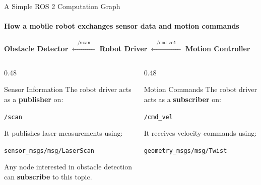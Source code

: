 \begin{frame}{A Simple ROS 2 Computation Graph}
\framesubtitle{How a mobile robot exchanges sensor data and motion commands}

\footnotesize

\begin{center}
    \textbf{Obstacle Detector}
    \(\xleftarrow{\quad \texttt{/scan} \quad}\)
    \textbf{Robot Driver}
    \(\xleftarrow{\quad \texttt{/cmd\_vel} \quad}\)
    \textbf{Motion Controller}
\end{center}

\vspace{0.15cm}

\begin{columns}[T,onlytextwidth]

    \begin{column}{0.48\textwidth}
        \begin{block}{Sensor Information}
            The robot driver acts as a
            \textbf{publisher} on:

            \begin{center}
                \texttt{/scan}
            \end{center}

            It publishes laser measurements using:

            \begin{center}
                \texttt{sensor\_msgs/msg/LaserScan}
            \end{center}

            Any node interested in obstacle detection can
            \textbf{subscribe} to this topic.
        \end{block}
    \end{column}

    \hfill

    \begin{column}{0.48\textwidth}
        \begin{exampleblock}{Motion Commands}
            The robot driver acts as a
            \textbf{subscriber} on:

            \begin{center}
                \texttt{/cmd\_vel}
            \end{center}

            It receives velocity commands using:

            \begin{center}
                \texttt{geometry\_msgs/msg/Twist}
            \end{center}


\end{exampleblock}
\end{column}
\end{columns}
\end{frame}

